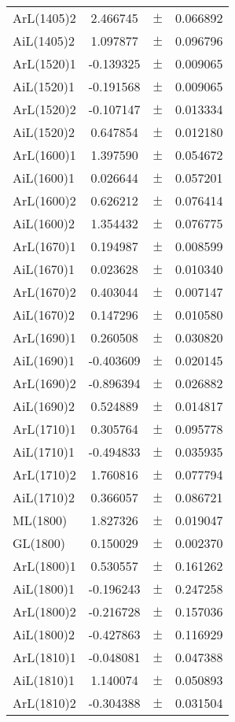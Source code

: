 \begin{table}
\begin{tiny}
\begin{tabular}{lccc}
ArL(1405)2 & 2.466745 & $\pm$ & 0.066892 \\
AiL(1405)2 & 1.097877 & $\pm$ & 0.096796 \\
ArL(1520)1 & -0.139325 & $\pm$ & 0.009065 \\
AiL(1520)1 & -0.191568 & $\pm$ & 0.009065 \\
ArL(1520)2 & -0.107147 & $\pm$ & 0.013334 \\
AiL(1520)2 & 0.647854 & $\pm$ & 0.012180 \\
ArL(1600)1 & 1.397590 & $\pm$ & 0.054672 \\
AiL(1600)1 & 0.026644 & $\pm$ & 0.057201 \\
ArL(1600)2 & 0.626212 & $\pm$ & 0.076414 \\
AiL(1600)2 & 1.354432 & $\pm$ & 0.076775 \\
ArL(1670)1 & 0.194987 & $\pm$ & 0.008599 \\
AiL(1670)1 & 0.023628 & $\pm$ & 0.010340 \\
ArL(1670)2 & 0.403044 & $\pm$ & 0.007147 \\
AiL(1670)2 & 0.147296 & $\pm$ & 0.010580 \\
ArL(1690)1 & 0.260508 & $\pm$ & 0.030820 \\
AiL(1690)1 & -0.403609 & $\pm$ & 0.020145 \\
ArL(1690)2 & -0.896394 & $\pm$ & 0.026882 \\
AiL(1690)2 & 0.524889 & $\pm$ & 0.014817 \\
ArL(1710)1 & 0.305764 & $\pm$ & 0.095778 \\
AiL(1710)1 & -0.494833 & $\pm$ & 0.035935 \\
ArL(1710)2 & 1.760816 & $\pm$ & 0.077794 \\
AiL(1710)2 & 0.366057 & $\pm$ & 0.086721 \\
ML(1800) & 1.827326 & $\pm$ & 0.019047 \\
GL(1800) & 0.150029 & $\pm$ & 0.002370 \\
ArL(1800)1 & 0.530557 & $\pm$ & 0.161262 \\
AiL(1800)1 & -0.196243 & $\pm$ & 0.247258 \\
ArL(1800)2 & -0.216728 & $\pm$ & 0.157036 \\
AiL(1800)2 & -0.427863 & $\pm$ & 0.116929 \\
ArL(1810)1 & -0.048081 & $\pm$ & 0.047388 \\
AiL(1810)1 & 1.140074 & $\pm$ & 0.050893 \\
ArL(1810)2 & -0.304388 & $\pm$ & 0.031504 \\

\end{tabular}
\end{tiny}
\end{table}
